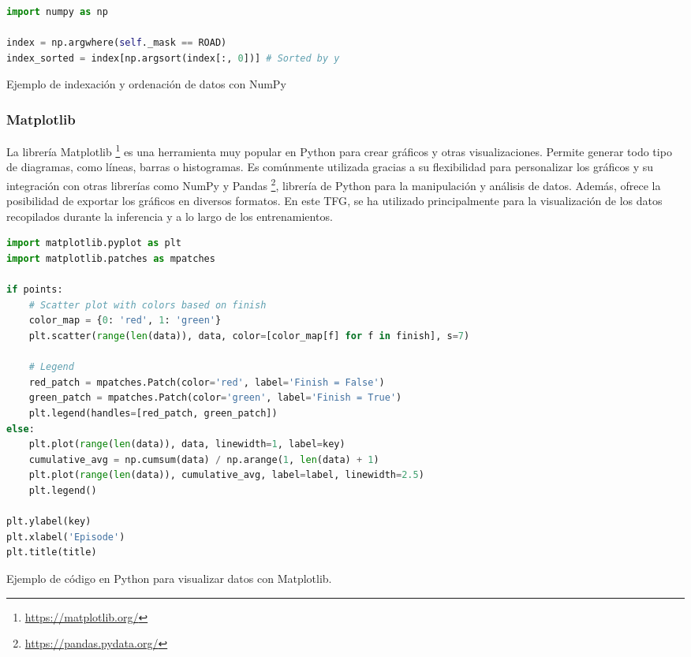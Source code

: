 \begin{code}[h]
\begin{lstlisting}[language=Python]
import numpy as np

index = np.argwhere(self._mask == ROAD)
index_sorted = index[np.argsort(index[:, 0])] # Sorted by y

\end{lstlisting}
\caption[Ejemplo de indexación y ordenación de datos con NumPy]{Ejemplo de indexación y ordenación de datos con NumPy}
\label{cod:numpy}
\end{code}

\subsubsection{Matplotlib}
\label{sec:plot}

La librería Matplotlib \footnote{\url{https://matplotlib.org/}} es una herramienta muy popular en Python para crear gráficos y otras visualizaciones. Permite generar todo tipo de diagramas, como líneas, barras o histogramas. Es comúnmente utilizada gracias a su flexibilidad para personalizar los gráficos y su integración con otras librerías como NumPy y Pandas \footnote{\url{https://pandas.pydata.org/}}, librería de Python para la manipulación y análisis de datos. Además, ofrece la posibilidad de exportar los gráficos en diversos formatos. En este \ac{TFG}, se ha utilizado principalmente para la visualización de los datos recopilados durante la inferencia y a lo largo de los entrenamientos.

\begin{code}[h]
\begin{lstlisting}[language=Python]
import matplotlib.pyplot as plt
import matplotlib.patches as mpatches

if points:
	# Scatter plot with colors based on finish
	color_map = {0: 'red', 1: 'green'}
	plt.scatter(range(len(data)), data, color=[color_map[f] for f in finish], s=7)
	
	# Legend
	red_patch = mpatches.Patch(color='red', label='Finish = False')
	green_patch = mpatches.Patch(color='green', label='Finish = True')
	plt.legend(handles=[red_patch, green_patch])  
else:
	plt.plot(range(len(data)), data, linewidth=1, label=key)
	cumulative_avg = np.cumsum(data) / np.arange(1, len(data) + 1)
	plt.plot(range(len(data)), cumulative_avg, label=label, linewidth=2.5)
	plt.legend()

plt.ylabel(key)
plt.xlabel('Episode')
plt.title(title)
\end{lstlisting}
\caption[Ejemplo de código en Python para visualizar datos con Matplotlib]{Ejemplo de código en Python para visualizar datos con Matplotlib.}
\label{cod:plot}
\end{code}

